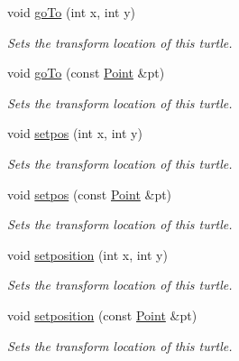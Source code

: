 \begin{DoxyCompactItemize}
\mbox{\label{classcturtle_1_1Turtle_a1ad8303d1ec02fb9d49b88946b73abf7}} 
void \hyperlink{classcturtle_1_1Turtle_a1ad8303d1ec02fb9d49b88946b73abf7}{go\+To} (int x, int y)
\begin{DoxyCompactList}\small\item\em Sets the transform location of this turtle. \end{DoxyCompactList}\item 
\mbox{\label{classcturtle_1_1Turtle_aebaca8328fa32d5fb286ad99a57b62fc}} 
void \hyperlink{classcturtle_1_1Turtle_aebaca8328fa32d5fb286ad99a57b62fc}{go\+To} (const \hyperlink{structcturtle_1_1ivec2}{Point} \&pt)
\begin{DoxyCompactList}\small\item\em Sets the transform location of this turtle. \end{DoxyCompactList}\item 
void \hyperlink{classcturtle_1_1Turtle_ab7e2193a04b72e94069fcccd85fa40db}{setpos} (int x, int y)
\begin{DoxyCompactList}\small\item\em Sets the transform location of this turtle. \end{DoxyCompactList}\item 
void \hyperlink{classcturtle_1_1Turtle_a72b2958266efc5b3aea86a459bd04d0b}{setpos} (const \hyperlink{structcturtle_1_1ivec2}{Point} \&pt)
\begin{DoxyCompactList}\small\item\em Sets the transform location of this turtle. \end{DoxyCompactList}\item 
void \hyperlink{classcturtle_1_1Turtle_a5e9dd0e59f48e49719dd4e3bd06a82f1}{setposition} (int x, int y)
\begin{DoxyCompactList}\small\item\em Sets the transform location of this turtle. \end{DoxyCompactList}\item 
void \hyperlink{classcturtle_1_1Turtle_a7a4726103a42d73006357cc12ce79b72}{setposition} (const \hyperlink{structcturtle_1_1ivec2}{Point} \&pt)
\begin{DoxyCompactList}\small\item\em Sets the transform location of this turtle. \end{DoxyCompactList}\item 

\end{DoxyCompactItemize}
